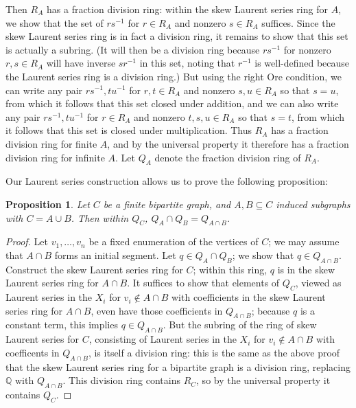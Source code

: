 \documentclass{amsart}
\newtheorem{prop}[theorem]{Proposition}
\theoremstyle{definition}
\theoremstyle{remark}
\numberwithin{equation}{section}
\begin{document}
Then $R_{A}$ has a fraction division ring: within the skew Laurent series ring for $A$, we show that the set of $rs^{-1}$ for $r \in R_{A}$ and nonzero $s \in R_{A}$ suffices. Since the skew Laurent series ring is in fact a division ring, it remains to show that this set is actually a subring. (It will then be a division ring because $rs^{-1}$ for nonzero $r, s \in R_{A}$ will have inverse $sr^{-1}$ in this set, noting that $r^{-1}$ is well-defined because the Laurent series ring is a division ring.) But using the right Ore condition, we can write any pair $rs^{-1}, tu^{-1}$ for $r, t \in R_{A}$ and nonzero $s, u \in R_{A}$ so that $s = u$, from which it follows that this set closed under addition, and we can also write any pair $rs^{-1}, tu^{-1}$ for $r \in R_{A}$ and nonzero $t, s, u \in R_{A}$ so that $s = t$, from which it follows that this set is closed under multiplication. Thus $R_{A}$ has a fraction division ring for finite $A$, and by the universal property it therefore has a fraction division ring for infinite $A$. Let $Q_{A}$ denote the fraction division ring of $R_{A}$.


Our Laurent series construction allows us to prove the following proposition:

\begin{prop}
    Let $C$ be a finite bipartite graph, and $A, B \subseteq C$ induced subgraphs with $C = A \cup B$. Then within $Q_{C}$, $Q_{A} \cap Q_{B} =Q_{A \cap B}$.
\end{prop}

\begin{proof}
    Let $v_{1}, \ldots, v_{n}$ be a fixed enumeration of the vertices of $C$; we may assume that $A \cap B $ forms an initial segment. Let $q \in Q_A \cap Q_B $; we show that $q \in Q_{A\cap B}$. Construct the skew Laurent series ring for $C$; within this ring, $q$ is in the skew Laurent series ring for $A\cap B$. It suffices to show that elements of $Q_{C}$, viewed as Laurent series in the $X_{i}$ for $v_{i} \notin A \cap B$ with coefficients in the skew Laurent series ring for $A \cap B$, even have those coefficients in $Q_{A \cap B}$; because $q$ is a constant term, this implies $q \in Q_{A \cap B}$. But the subring of the ring of  skew Laurent series for $C$, consisting of Laurent series in the $X_{i}$ for $v_{i} \notin A \cap B$ with coefficents in $Q_{A\cap B}$, is itself a division ring: this is the same as the above proof that the skew Laurent series ring for a bipartite graph is a division ring, replacing $\mathbb{Q}$ with $Q_{A\cap B}$. This division ring contains $R_{C}$, so by the universal property it contains $Q_C$.
    
    
\end{proof}
\end{document}
